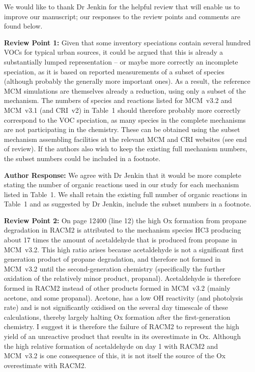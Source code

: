 \documentclass{article}
\begin{document}
We would like to thank Dr Jenkin for the helpful review that will enable us to improve our manuscript; our responses to the review points and comments are found below.

\textbf{Review Point 1:} Given that some inventory speciations contain several hundred VOCs for typical urban sources, it could be argued that this is already a substantially lumped representation – or maybe more correctly an incomplete speciation, as it is based on reported measurements of a subset of species (although probably the generally more important ones). As a result, the reference MCM simulations are themselves already a reduction, using only a subset of the mechanism. The numbers of species and reactions listed for MCM~v3.2 and MCM~v3.1 (and CRI~v2) in Table~1 should therefore probably more correctly correspond to the VOC speciation, as many species in the complete mechanisms are not participating in the chemistry. These can be obtained using the subset mechanism assembling facilities at the relevant MCM and CRI websites (see end of review). If the authors also wish to keep the existing full mechanism numbers, the subset numbers could be included in a footnote.

\textbf{Author Response:} We agree with Dr Jenkin that it would be more complete stating the number of organic reactions used in our study for each mechanism listed in Table~1. 
We shall retain the existing full number of organic reactions in Table~1 and as suggested by Dr Jenkin, include the subset numbers in a footnote.

\textbf{Review Point 2:} On page 12400 (line 12) the high Ox formation from propane degradation in RACM2 is attributed to the mechanism species HC3 producing about 17 times the amount of acetaldehyde that is produced from propane in MCM~v3.2. This high ratio arises because acetaldehyde is not a significant first generation product of propane degradation, and therefore not formed in MCM~v3.2 until the second-generation chemistry (specifically the further oxidation of the relatively minor product, propanal). Acetaldehyde is therefore formed in RACM2 instead of other products formed in MCM~v3.2 (mainly acetone, and some propanal). Acetone, has a low OH reactivity (and photolysis rate) and is not significantly oxidised on the several day timescale of these calculations, thereby largely halting Ox formation after the first-generation chemistry. I suggest it is therefore the failure of RACM2 to represent the high yield of an unreactive product that results in its overestimate in Ox. Although the high relative formation of acetaldehyde on day 1 with RACM2 and MCM~v3.2 is one consequence of this, it is not itself the source of the Ox overestimate with RACM2.
\end{document}
